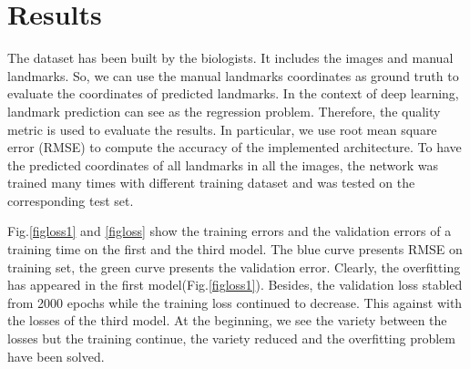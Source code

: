 \documentclass[conference]{IEEEtran}
\begin{document}
\section{Results}
The dataset has been built by the biologists. It includes the images and manual landmarks. So, we can use the manual landmarks coordinates as ground truth to evaluate the coordinates of predicted landmarks. In the context of deep learning, landmark prediction can see as the regression problem. Therefore, the quality metric is used to evaluate the results. In particular, we use root mean square error (RMSE) to compute the accuracy of the implemented architecture. To have the predicted coordinates of all landmarks in all the images, the network was trained many times with different training dataset and was tested on the corresponding test set.

Fig.\ref{figloss1} and \ref{figloss} show the training errors and the validation errors of a training time on the first and the third model. The blue curve presents RMSE on training set, the green curve presents the validation error. Clearly, the overfitting has appeared in the first model(Fig.\ref{figloss1}). Besides, the validation loss stabled from 2000 epochs while the training loss continued to decrease. This against with the losses of the third model. At the beginning, we see the variety between the losses but the training continue, the variety reduced and the overfitting problem have been solved.
\end{document}
